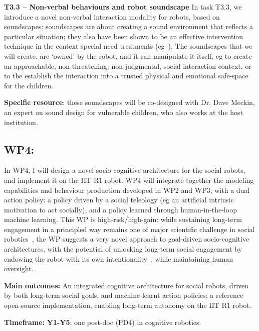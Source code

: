 \documentclass[11pt,a4paper]{report}
\begin{document}
\textbf{T3.3 -- Non-verbal behaviours and robot soundscape} In task T3.3, we
introduce a novel non-verbal interaction modality for robots, based on
soundscapes: soundscapes are about creating a sound environment that reflects a
particular situation; they also have been shown to be an effective intervention
technique in the context special need treatments
(eg~\cite{greher2010soundscape}). The soundscapes that we will create, are
`owned' by the robot, and it can manipulate it itself, eg to create an
approachable, non-threatening, non-judgmental, social interaction context, or to
the establish the interaction into a trusted physical and emotional safe-space
for the children.

\textbf{Specific resource}: these soundscapes will be co-designed with Dr.
Dave Meckin, an expert on sound design for vulnerable children, who also works
at the host institution.

\subsection{WP4: \textbf{\wpFour}}

In WP4, I will design a novel socio-cognitive architecture for the social
robots, and implement it on the IIT R1 robot.  WP4 will integrate together the
modeling capabilities and behaviour production developed in WP2 and WP3, with a
dual action policy: a policy driven by a social teleology (eg an artificial
intrinsic motivation to act socially), and a policy learned through
human-in-the-loop machine learning. This WP is high-risk/high-gain: while sustaining
long-term engagement in a principled way remains one of major scientific
challenge in social robotics~\cite{hoffman2019anki}, the WP suggests a very novel
approach to goal-driven socio-cognitive architectures, with the potential of
unlocking long-term social engagement by endowing the robot with its own
intentionality~\cite{wiese2017robots}, while maintaining human oversight.

\begin{framed}
    \textbf{Main outcomes:} An integrated cognitive architecture for social
    robots, driven by both long-term social goals, and machine-learnt action
    policies; a reference open-source implementation, enabling long-term
    autonomy on the IIT R1 robot.

    \textbf{Timeframe:} \textbf{Y1-Y5}; one post-doc (PD4) in cognitive robotics.

\end{framed}
\end{document}
